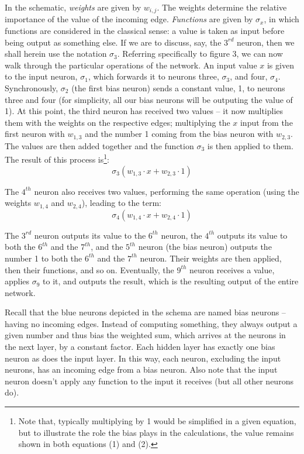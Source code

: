 \documentclass[11pt]{article}
\begin{document}
In the schematic, \textit{weights} are given by $w_{i, j}$. The weights determine the relative importance of the value of the incoming edge. \textit{Functions} are given by $\sigma_{x}$, in which functions are considered in the classical sense: a value is taken as input before being output as something else. If we are to discuss, say, the $3^{rd}$ neuron, then we shall herein use the notation $\sigma_{3}$.
	Referring specifically to figure 3, we can now walk through the particular operations of the network. An input value $x$ is given to the input neuron, $\sigma_{1}$, which forwards it to neurons three, $\sigma_{3}$, and four, $\sigma_{4}$. Synchronously, $\sigma_{2}$ (the first bias neuron) sends a constant value, 1, to neurons three and four (for simplicity, all our bias neurons will be outputing the value of 1). At this point, the third neuron has received two values – it now multiplies them with the weights on the respective edges; multiplying the $x$ input from the first neuron with $w_{1, 3}$ and the number 1 coming from the bias neuron with $w_{2, 3}$. The values are then added together and the function $\sigma_{3}$ is then applied to them. The result of this process is\footnote{Note that, typically multiplying by 1 would be simplified in a given equation, but to illustrate the role the bias plays in the calculations, the value remains shown in both equations (1) and (2).}:
\begin{equation}\sigma_{3}(w_{1, 3}\cdot x + w_{2, 3}\cdot 1)\end{equation}

The $4^{th}$ neuron also receives two values, performing the same operation (using the weights $w_{1, 4}$ and $w_{2, 4}$), leading to the term: 
\begin{equation}\sigma_{4}(w_{1, 4}\cdot x + w_{2, 4}\cdot 1)\end{equation}

The $3^{rd}$ neuron outputs its value to the $6^{th}$ neuron, the $4^{th}$ outputs its value to both the $6^{th}$ and the $7^{th}$, and the $5^{th}$ neuron (the bias neuron) outputs the number 1 to both the $6^{th}$ and the $7^{th}$ neuron. Their weights are then applied, then their functions, and so on. Eventually, the $9^{th}$ neuron receives a value, applies $\sigma_{9}$ to it, and outputs the result, which is the resulting output of the entire network.

Recall that the blue neurons depicted in the schema are named bias neurons – having no incoming edges. Instead of computing something, they always output a given number and thus bias the weighted sum, which arrives at the neurons in the next layer, by a constant factor. Each hidden layer has exactly one bias neuron as does the input layer. In this way, each neuron, excluding the input neurons, has an incoming edge from a bias neuron. Also note that the input neuron doesn't apply any function to the input it receives (but all other neurons do).
\end{document}
